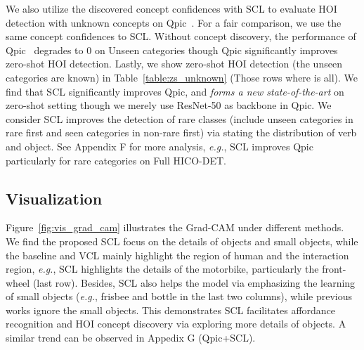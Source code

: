 \documentclass[runningheads]{llncs}
\newcommand{\eg}{\textit{e.g.}}
\begin{document}
We also utilize the discovered concept confidences with SCL to evaluate HOI detection with unknown concepts on Qpic~\cite{tamura_cvpr2021}. For a fair comparison, we use the same concept confidences to SCL. Without concept discovery, the performance of Qpic~\cite{tamura_cvpr2021} degrades to 0 on Unseen categories though Qpic significantly improves zero-shot HOI detection.
Lastly, we show zero-shot HOI detection (the unseen categories are known) in Table~\ref{table:zs_unknown} (Those rows where  is all). We find that SCL significantly improves Qpic, and \textit{forms a new state-of-the-art} on zero-shot setting though we merely use ResNet-50 as backbone in Qpic. We consider SCL improves the detection of rare classes (include unseen categories in rare first and seen categories in non-rare first) via stating the distribution of verb and object. See Appendix F for more analysis, \eg, SCL improves Qpic particularly for rare categories on Full HICO-DET.



























\subsection{Visualization}

 Figure~\ref{fig:vis_grad_cam} illustrates the Grad-CAM under different methods. We find the proposed SCL focus on the details of objects and small objects, while the baseline and VCL mainly highlight the region of human and the interaction region, \eg, SCL highlights the details of the motorbike, particularly the front-wheel (last row). Besides, SCL also helps the model via emphasizing the learning of small objects (\eg, frisbee and bottle in the last two columns), while previous works ignore the small objects. This demonstrates SCL facilitates affordance recognition and HOI concept discovery via exploring more details of objects. A similar trend can be observed in Appedix G (Qpic+SCL).
\end{document}
